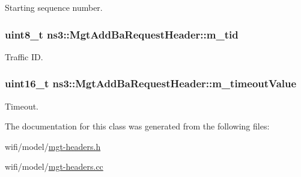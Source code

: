 Starting sequence number. 

\subsubsection[{\texorpdfstring{m\+\_\+tid}{m_tid}}]{\setlength{\rightskip}{0pt plus 5cm}uint8\+\_\+t ns3\+::\+Mgt\+Add\+Ba\+Request\+Header\+::m\+\_\+tid\hspace{0.3cm}{\ttfamily [private]}}\hypertarget{classns3_1_1MgtAddBaRequestHeader_a31067469a11e1397747376a08c1b1e6e}{}\label{classns3_1_1MgtAddBaRequestHeader_a31067469a11e1397747376a08c1b1e6e}


Traffic ID. 

\subsubsection[{\texorpdfstring{m\+\_\+timeout\+Value}{m_timeoutValue}}]{\setlength{\rightskip}{0pt plus 5cm}uint16\+\_\+t ns3\+::\+Mgt\+Add\+Ba\+Request\+Header\+::m\+\_\+timeout\+Value\hspace{0.3cm}{\ttfamily [private]}}\hypertarget{classns3_1_1MgtAddBaRequestHeader_adb30ab7abdf354bc3555f49caf9f018c}{}\label{classns3_1_1MgtAddBaRequestHeader_adb30ab7abdf354bc3555f49caf9f018c}


Timeout. 



The documentation for this class was generated from the following files\+:\begin{DoxyCompactItemize}
\item 
wifi/model/\hyperlink{mgt-headers_8h}{mgt-\/headers.\+h}\item 
wifi/model/\hyperlink{mgt-headers_8cc}{mgt-\/headers.\+cc}\end{DoxyCompactItemize}
